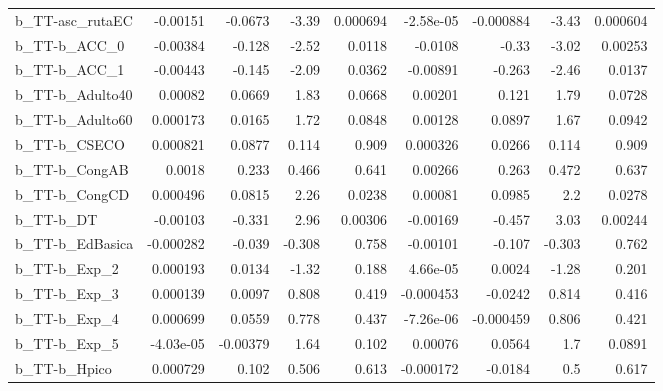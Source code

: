 \begin{tabular}{lrrrrrrrr}
b\_TT-asc\_rutaEC            &    -0.00151 &      -0.0673 &    -3.39 & 0.000694 &  -2.58e-05 &   -0.000884 &        -3.43 &      0.000604 \\
b\_TT-b\_ACC\_0               &    -0.00384 &       -0.128 &    -2.52 &   0.0118 &    -0.0108 &       -0.33 &        -3.02 &       0.00253 \\
b\_TT-b\_ACC\_1               &    -0.00443 &       -0.145 &    -2.09 &   0.0362 &   -0.00891 &      -0.263 &        -2.46 &        0.0137 \\
b\_TT-b\_Adulto40            &     0.00082 &       0.0669 &     1.83 &   0.0668 &    0.00201 &       0.121 &         1.79 &        0.0728 \\
b\_TT-b\_Adulto60            &    0.000173 &       0.0165 &     1.72 &   0.0848 &    0.00128 &      0.0897 &         1.67 &        0.0942 \\
b\_TT-b\_CSECO               &    0.000821 &       0.0877 &    0.114 &    0.909 &   0.000326 &      0.0266 &        0.114 &         0.909 \\
b\_TT-b\_CongAB              &      0.0018 &        0.233 &    0.466 &    0.641 &    0.00266 &       0.263 &        0.472 &         0.637 \\
b\_TT-b\_CongCD              &    0.000496 &       0.0815 &     2.26 &   0.0238 &    0.00081 &      0.0985 &          2.2 &        0.0278 \\
b\_TT-b\_DT                  &    -0.00103 &       -0.331 &     2.96 &  0.00306 &   -0.00169 &      -0.457 &         3.03 &       0.00244 \\
b\_TT-b\_EdBasica            &   -0.000282 &       -0.039 &   -0.308 &    0.758 &   -0.00101 &      -0.107 &       -0.303 &         0.762 \\
b\_TT-b\_Exp\_2               &    0.000193 &       0.0134 &    -1.32 &    0.188 &   4.66e-05 &      0.0024 &        -1.28 &         0.201 \\
b\_TT-b\_Exp\_3               &    0.000139 &       0.0097 &    0.808 &    0.419 &  -0.000453 &     -0.0242 &        0.814 &         0.416 \\
b\_TT-b\_Exp\_4               &    0.000699 &       0.0559 &    0.778 &    0.437 &  -7.26e-06 &   -0.000459 &        0.806 &         0.421 \\
b\_TT-b\_Exp\_5               &   -4.03e-05 &     -0.00379 &     1.64 &    0.102 &    0.00076 &      0.0564 &          1.7 &        0.0891 \\
b\_TT-b\_Hpico               &    0.000729 &        0.102 &    0.506 &    0.613 &  -0.000172 &     -0.0184 &          0.5 &         0.617 \\

\end{tabular}
